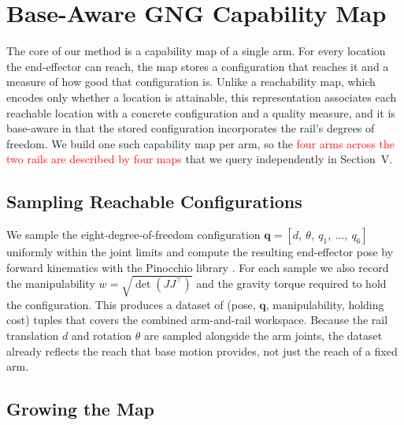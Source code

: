 \documentclass[conference]{IEEEtran}
\begin{document}
\section{Base-Aware GNG Capability Map}

The core of our method is a capability map of a single arm. For every location the
end-effector can reach, the map stores a configuration that reaches it and a
measure of how good that configuration is. Unlike a reachability map, which encodes
only whether a location is attainable, this representation associates each
reachable location with a concrete configuration and a quality measure, and it is
base-aware in that the stored configuration incorporates the rail's degrees of
freedom. We build one such capability map per arm, so the \textcolor{red}{four arms across the two rails
are described by four maps} that we query independently in Section~V.

\subsection{Sampling Reachable Configurations}

We sample the eight-degree-of-freedom configuration
$\mathbf{q} = [d,\ \theta,\ q_1,\ \ldots,\ q_6]$ uniformly within the joint limits
and compute the resulting end-effector pose by forward kinematics with the
Pinocchio library \cite{Carpentier2019}. For each sample we also record the
manipulability $w = \sqrt{\det(JJ^\top)}$ \cite{Yoshikawa1985} and the gravity
torque required to hold the configuration. This produces a dataset of
(pose, $\mathbf{q}$, manipulability, holding cost) tuples that covers the combined
arm-and-rail workspace. Because the rail translation $d$ and rotation $\theta$ are
sampled alongside the arm joints, the dataset already reflects the reach that base
motion provides, not just the reach of a fixed arm.

\subsection{Growing the Map}
\end{document}
